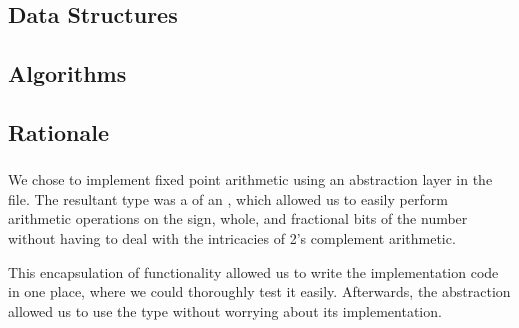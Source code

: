 \subsection{Data Structures}
	\subsubsection{}
\subsection{Algorithms}
	\subsubsection{}
	\subsubsection{}
	\subsubsection{}
\subsection{Rationale}
	\subsubsection{}
	\subsubsection{}
		We chose to implement fixed point arithmetic using an abstraction layer in the  file. The resultant  type was a  of an , which allowed us to easily perform arithmetic operations on the sign, whole, and fractional bits of the number without having to deal with the intricacies of 2's complement arithmetic.
		
		This encapsulation of functionality allowed us to write the implementation code in one place, where we could thoroughly test it easily. Afterwards, the abstraction allowed us to use the  type without worrying about its implementation.